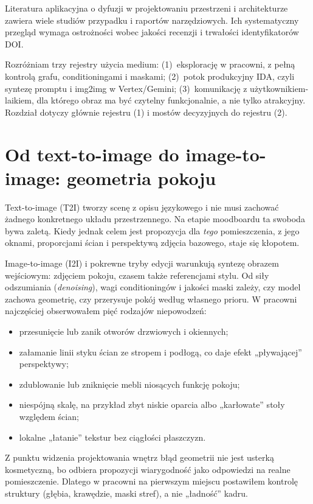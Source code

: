 Literatura aplikacyjna o dyfuzji w projektowaniu przestrzeni i architekturze zawiera wiele studiów przypadku i raportów narzędziowych. Ich systematyczny przegląd wymaga ostrożności wobec jakości recenzji i trwałości identyfikatorów DOI.

Rozróżniam trzy rejestry użycia medium: (1)~eksplorację w pracowni, z pełną kontrolą grafu, conditioningami i maskami; (2)~potok produkcyjny IDA, czyli syntezę promptu i img2img w Vertex/Gemini; (3)~komunikację z użytkownikiem-laikiem, dla którego obraz ma być czytelny funkcjonalnie, a nie tylko atrakcyjny. Rozdział dotyczy głównie rejestru (1) i mostów decyzyjnych do rejestru (2).

\section{Od text-to-image do image-to-image: geometria pokoju}
\label{ch04:sec:t2i-i2i}

Text-to-image (T2I) tworzy scenę z opisu językowego i nie musi zachować żadnego konkretnego układu przestrzennego. Na etapie moodboardu ta swoboda bywa zaletą. Kiedy jednak celem jest propozycja dla \emph{tego} pomieszczenia, z jego oknami, proporcjami ścian i perspektywą zdjęcia bazowego, staje się kłopotem.

Image-to-image (I2I) i pokrewne tryby edycji warunkują syntezę obrazem wejściowym: zdjęciem pokoju, czasem także referencjami stylu. Od siły odszumiania (\emph{denoising}), wagi conditioningów i jakości maski zależy, czy model zachowa geometrię, czy przerysuje pokój według własnego prioru.
W pracowni najczęściej obserwowałem pięć rodzajów niepowodzeń:
\begin{itemize}
  \item przesunięcie lub zanik otworów drzwiowych i okiennych;
  \item załamanie linii styku ścian ze stropem i podłogą, co daje efekt „pływającej” perspektywy;
  \item zdublowanie lub zniknięcie mebli niosących funkcję pokoju;
  \item niespójną skalę, na przykład zbyt niskie oparcia albo „karłowate” stoły względem ścian;
  \item lokalne „łatanie” tekstur bez ciągłości płaszczyzn.
\end{itemize}

Z punktu widzenia projektowania wnętrz błąd geometrii nie jest usterką kosmetyczną, bo odbiera propozycji wiarygodność jako odpowiedzi na realne pomieszczenie.
Dlatego w pracowni na pierwszym miejscu postawiłem kontrolę struktury (głębia, krawędzie, maski stref), a nie „ładność” kadru.

